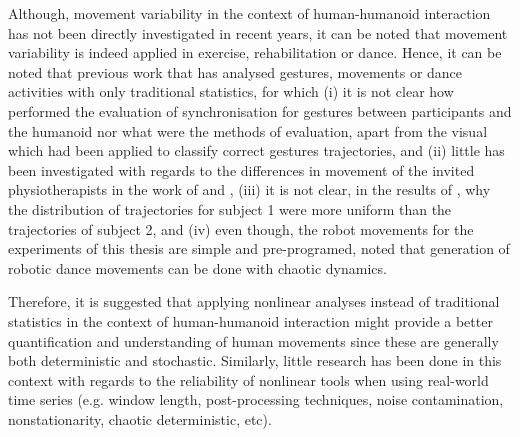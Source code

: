 

Although, movement variability in the context of human-humanoid interaction
has not been directly investigated in recent years, it can be noted 
that movement variability is indeed applied in exercise, 
rehabilitation or dance.
Hence, it can be noted that previous work that has analysed gestures, 
movements or dance activities with only traditional statistics, for which
(i) it is not clear how \cite{gorer2013} performed the evaluation of 
synchronisation for gestures between participants and the humanoid
nor what were the methods of evaluation, apart from the visual 
which had been applied to classify correct gestures trajectories,
 and (ii) little has been investigated with regards to the 
differences in movement of the invited physiotherapists in the work of
\cite{guneysu2014} and  \cite{guneysu2015},
(iii) it is not clear, in the results of \cite{tsuchida2013}, 
why the distribution of trajectories for subject 1 
were more uniform than the trajectories of subject 2, and
(iv) even though, the robot movements for the experiments of this thesis 
are simple and pre-programed, \cite{peng2015} noted that generation of 
robotic dance movements can be done with chaotic dynamics.

Therefore, it is suggested that applying nonlinear analyses 
instead of traditional statistics in the context of human-humanoid 
interaction might provide a better quantification and understanding
of human movements since these are generally both deterministic and stochastic.
Similarly, little research has been done in this context 
with regards to the reliability of nonlinear tools 
when using real-world time series 
(e.g. window length, post-processing techniques, 
noise contamination, nonstationarity, chaotic deterministic, etc).



